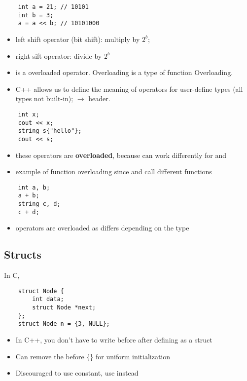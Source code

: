 \begin{lstlisting}
    int a = 21; // 10101
    int b = 3;
    a = a << b; // 10101000
\end{lstlisting}
\begin{itemize}
      \item left shift operator (bit shift): multiply by $ 2^b $;
      \item right sift operator: divide by $ 2^b $
      \item \code{<{}<} is a overloaded operator. Overloading is a type of function
            Overloading.
      \item C++ allows us to define the meaning of operators for user-define types
            (all types not built-in);  $ \rightarrow $ 
            header.
\end{itemize}
\begin{lstlisting}
    int x;
    cout << x;
    string s{"hello"};
    cout << s;
\end{lstlisting}
\begin{itemize}
      \item these operators are \textbf{overloaded}, because \code{<{}<} can work
            differently for  and 
      \item example of function overloading since 
            and  call different functions
\end{itemize}
\begin{lstlisting}
    int a, b;
    a + b;
    string c, d;
    c + d;
\end{lstlisting}
\begin{itemize}
      \item operators are overloaded as \code{+} differs depending on the type
\end{itemize}

\subsection{Structs}
In C,
\begin{lstlisting}
    struct Node {
        int data;
        struct Node *next;
    };
    struct Node n = {3, NULL};
\end{lstlisting}
\begin{itemize}
      \item In C++, you don't have to write  before  after defining
             as a struct
      \item Can remove the \code{=} before \{\} for uniform initialization
      \item Discouraged to use  constant, use  instead
\end{itemize}

